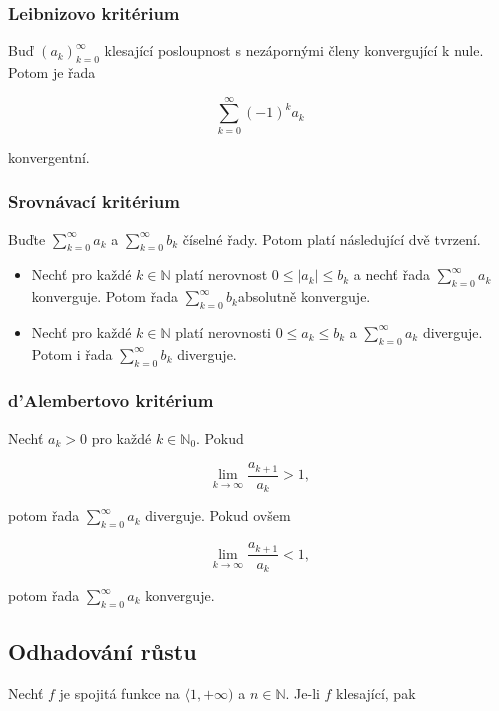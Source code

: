 \documentclass{szzclass}
\begin{document}
\subsubsection{Leibnizovo kritérium}
Buď $(a_k)_{k=0}^\infty$ klesající posloupnost s nezápornými členy konvergující k nule. Potom je řada

\begin{equation*}
\sum_{k=0}^\infty (-1)^k a_k\end{equation*}

konvergentní.

\subsubsection{Srovnávací kritérium}
Buďte $\sum_{k=0}^\infty a_k$ a $\sum_{k=0}^\infty b_k$
číselné řady. Potom platí následující dvě tvrzení.
\begin{itemize}
    \item Nechť pro každé $k\in\mathbb{N}$ platí nerovnost
    $0\leq|a_k|\leq b_k$ a nechť řada $\sum_{k=0}^\infty a_k$
    konverguje. Potom řada $\sum_{k=0}^\infty b_k$absolutně konverguje.
    \item Nechť pro každé $k\in\mathbb{N}$ platí nerovnosti
    $0\leq a_k\leq b_k$ a $\sum_{k=0}^\infty a_k$ diverguje.
    Potom i řada $\sum_{k=0}^\infty b_k$ diverguje.
\end{itemize}

\subsubsection{d'Alembertovo kritérium}
Nechť $a_k>0$ pro každé $k\in \mathbb{N}_0$. Pokud

\begin{equation*}
\lim_{k\to\infty} \frac{a_{k+1}}{a_k} > 1,\end{equation*}

potom řada  $\sum_{k=0}^\infty a_k$ diverguje. Pokud ovšem

\begin{equation*}
\lim_{k\to\infty} \frac{a_{k+1}}{a_k} < 1,\end{equation*}

potom řada  $\sum_{k=0}^\infty a_k$ konverguje.

\subsection{Odhadování růstu}
Nechť $f$ je spojitá funkce na $\langle 1,+\infty)$ a $n\in\mathbb{N}$. Je-li $f$ klesající, pak
\end{document}
